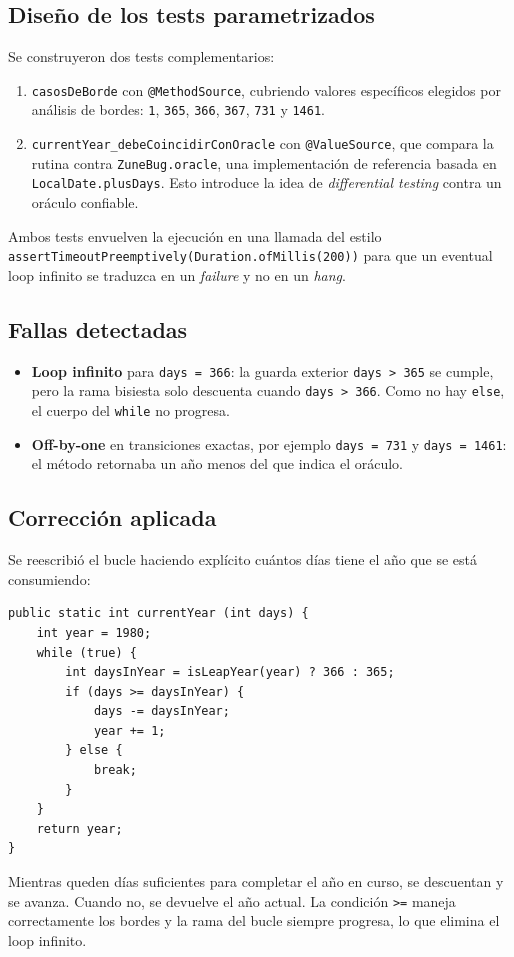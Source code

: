 \documentclass[12pt,a4paper]{article}
\begin{document}
\subsection{Diseño de los tests parametrizados}
Se construyeron dos tests complementarios:
\begin{enumerate}
  \item \texttt{casosDeBorde} con \texttt{@MethodSource}, cubriendo valores específicos elegidos por análisis de bordes: \texttt{1}, \texttt{365}, \texttt{366}, \texttt{367}, \texttt{731} y \texttt{1461}.
  \item \texttt{currentYear\_debeCoincidirConOracle} con \texttt{@ValueSource}, que compara la rutina contra \texttt{ZuneBug.oracle}, una implementación de referencia basada en \texttt{LocalDate.plusDays}. Esto introduce la idea de \textit{differential testing} contra un oráculo confiable.
\end{enumerate}

Ambos tests envuelven la ejecución en una llamada del estilo \texttt{assert\-Timeout\-Preemptively(}\allowbreak\texttt{Duration.ofMillis(200))} para que un eventual loop infinito se traduzca en un \textit{failure} y no en un \textit{hang}.

\subsection{Fallas detectadas}
\begin{itemize}
  \item \textbf{Loop infinito} para \texttt{days = 366}: la guarda exterior \texttt{days > 365} se cumple, pero la rama bisiesta solo descuenta cuando \texttt{days > 366}. Como no hay \texttt{else}, el cuerpo del \texttt{while} no progresa.
  \item \textbf{Off-by-one} en transiciones exactas, por ejemplo \texttt{days = 731} y \texttt{days = 1461}: el método retornaba un año menos del que indica el oráculo.
\end{itemize}

\subsection{Corrección aplicada}
Se reescribió el bucle haciendo explícito cuántos días tiene el año que se está consumiendo:
\begin{lstlisting}[style=javastyle]
public static int currentYear (int days) {
    int year = 1980;
    while (true) {
        int daysInYear = isLeapYear(year) ? 366 : 365;
        if (days >= daysInYear) {
            days -= daysInYear;
            year += 1;
        } else {
            break;
        }
    }
    return year;
}
\end{lstlisting}
Mientras queden días suficientes para completar el año en curso, se descuentan y se avanza. Cuando no, se devuelve el año actual. La condición \texttt{>=} maneja correctamente los bordes y la rama del bucle siempre progresa, lo que elimina el loop infinito.
\end{document}
